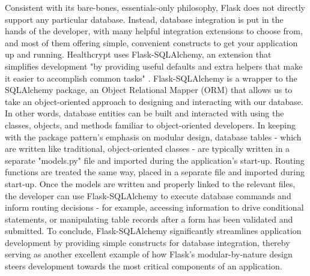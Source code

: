 \documentclass[letterpaper, 10pt,DIV=13]{scrartcl}
\begin{document}
\begin{multicols}{2}
\begin{spacing}{1.25}
Consistent with its bare-bones, essentials-only philosophy, Flask does not directly support any particular database. Instead, database integration is put in the hands of the developer, with many helpful integration extensions to choose from, and most of them offering simple, convenient constructs to get your application up and running. Healthcrypt uses Flask-SQLAlchemy, an extension that simplifies development "by providing useful defaults and extra helpers that make it easier to accomplish common tasks" \cite{Flask-SQLAlchemyDocs}. Flask-SQLAlchemy is a wrapper to the SQLAlchemy package, an Object Relational Mapper (ORM) that allows us to take an object-oriented approach to designing and interacting with our database. In other words, database entities can be built and interacted with using the classes, objects, and methods familiar to object-oriented developers. In keeping with the package pattern's emphasis on modular design, database tables - which are written like traditional, object-oriented classes - are typically written in a separate "models.py" file and imported during the application's start-up. Routing functions are treated the same way, placed in a separate file and imported during start-up. Once the models are written and properly linked to the relevant files, the developer can use Flask-SQLAlchemy to execute database commands and inform routing decisions - for example, accessing information to drive conditional statements, or manipulating table records after a form has been validated and submitted. To conclude, Flask-SQLAlchemy significantly streamlines application development by providing simple constructs for database integration, thereby serving as another excellent example of how Flask's modular-by-nature design steers development towards the most critical components of an application.


\end{spacing}
\end{multicols}
\end{document}
